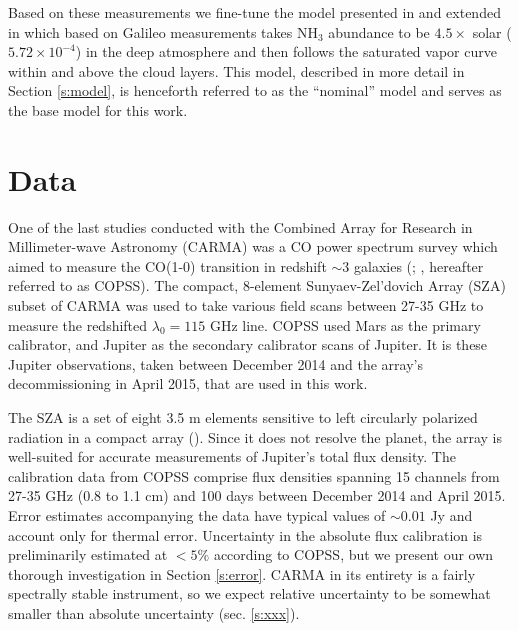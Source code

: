 \documentclass{article}
\newcommand{\e}[1]{\times 10^{#1}}
\begin{document}
	Based on these measurements we fine-tune the model presented in \citealt{2001Icar..149...66D} and extended in \citealt{2016Sci...352.1198D} which based on Galileo measurements takes NH$_{3}$ abundance to be $4.5 \times$ solar ($5.72 \e{-4}$) in the deep atmosphere and then follows the saturated vapor curve within and above the cloud layers.
	This model, described in more detail in Section \ref{s:model}, is henceforth referred to as the ``nominal'' model and serves as the base model for this work.


\section{Data} \label{s:data}
	One of the last studies conducted with the Combined Array for Research in Millimeter-wave Astronomy (CARMA) was a CO power spectrum survey which aimed to measure the CO(1-0) transition in redshift $\sim 3$ galaxies (\citealt{2015ApJ...814..140K}; \citealt{2016ApJ...830...34K}, hereafter referred to as COPSS).
	The compact, 8-element Sunyaev-Zel'dovich Array (SZA) subset of CARMA was used to take various field scans between 27-35 GHz to measure the redshifted $\lambda_{0} = 115$ GHz line.
	COPSS used Mars as the primary calibrator, and Jupiter as the secondary calibrator scans of Jupiter.
	It is these Jupiter observations, taken between December 2014 and the array's decommissioning in April 2015, that are used in this work.

	The SZA is a set of eight 3.5 m elements sensitive to left circularly polarized radiation in a compact array (\citealt{2015ApJ...814..140K}).
	Since it does not resolve the planet, the array is well-suited for accurate measurements of Jupiter's total flux density.
	The calibration data from COPSS comprise flux densities spanning 15 channels from 27-35 GHz (0.8 to 1.1 cm) and 100 days between December 2014 and April 2015.
	Error estimates accompanying the data have typical values of $\sim0.01$ Jy and account only for thermal error.
	Uncertainty in the absolute flux calibration is preliminarily estimated at $<5\%$ according to COPSS, but we present our own thorough investigation in Section \ref{s:error}.
	CARMA in its entirety is a fairly spectrally stable instrument, so we expect relative uncertainty to be somewhat smaller than absolute uncertainty (sec. \ref{s:xxx}).
\end{document}
